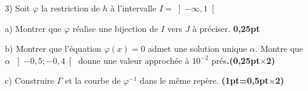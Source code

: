 \documentclass[12pt]{article}
\begin{document}
3) Soit $\varphi$ la restriction de $h$ à l’intervalle $I=\left]-\infty, 1\right[ $
    
    a) Montrer que $\varphi$  réalise une bijection de $I$ vers $J$  à préciser.
    \textbf{0,25pt}
        
    b) Montrer que l’équation $\varphi(x)=0$ admet une solution unique $\alpha$. Montre que $\alpha$ 
    $\left]-0,5 ; -0,4 \right[ $ donne une valeur approchée à $10^{-2}$ prés\textbf{.(0,25pt$\times$2)}
    
    c) Construire $\Gamma$ et la courbe de $\varphi^{-1}$  dans le même repère.  \textbf{(1pt=0,5pt$\times$2)}
\end{document}
